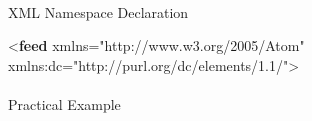 \documentclass[
  letterpaper,
  DIV=11,
  numbers=noendperiod]{scrartcl}
\makeatletter
\let\oldparagraph\paragraph
\renewcommand{\paragraph}{
    \@ifstar
      \xxxParagraphStar
      \xxxParagraphNoStar
  }
\newcommand{\xxxParagraphStar}[1]{\oldparagraph*{#1}\mbox{}}
\newcommand{\xxxParagraphNoStar}[1]{\oldparagraph{#1}\mbox{}}
\newenvironment{Shaded}{\begin{snugshade}}{\end{snugshade}}
\newcommand{\KeywordTok}[1]{\textcolor[rgb]{0.00,0.23,0.31}{\textbf{#1}}}
\newcommand{\NormalTok}[1]{\textcolor[rgb]{0.00,0.23,0.31}{#1}}
\newcommand{\OtherTok}[1]{\textcolor[rgb]{0.00,0.23,0.31}{#1}}
\newcommand{\StringTok}[1]{\textcolor[rgb]{0.13,0.47,0.30}{#1}}
\makeatother
\begin{document}
\paragraph{XML Namespace Declaration}\label{xml-namespace-declaration-1}

\begin{Shaded}
\begin{Highlighting}[]
\NormalTok{\textless{}}\KeywordTok{feed}\OtherTok{ xmlns=}\StringTok{"http://www.w3.org/2005/Atom"}
\OtherTok{      xmlns:dc=}\StringTok{"http://purl.org/dc/elements/1.1/"}\NormalTok{\textgreater{}}
\end{Highlighting}
\end{Shaded}

\paragraph{Practical Example}\label{practical-example-1}
\end{document}
